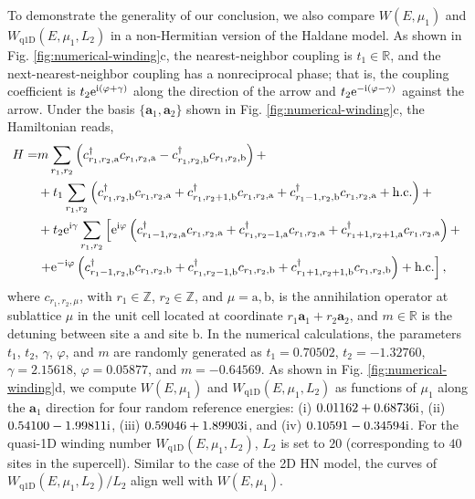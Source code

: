 To demonstrate the generality of our conclusion, we also compare $W(E,\mu_{1})$
and $W_{\text{q1D}}(E,\mu_{1},L_{2})$ in a non-Hermitian version
of the Haldane model. As shown in Fig. \ref{fig:numerical-winding}c,
the nearest-neighbor coupling is $t_{1}\in\mathbb{R}$, and the next-nearest-neighbor
coupling has a nonreciprocal phase; that is, the coupling coefficient
is $t_{2}\mathrm{e}^{\mathrm{i}\left(\varphi+\gamma\right)}$ along the direction
of the arrow and $t_{2}\mathrm{e}^{-\mathrm{i}\left(\varphi-\gamma\right)}$ against
the arrow. Under the basis $\{\mathbf{a}_{1},\mathbf{a}_{2}\}$ shown
in Fig. \ref{fig:numerical-winding}c, the Hamiltonian reads, 
\begin{align}
H= & m\sum_{r_{1},r_{2}}\left(c_{r_{1},r_{2},\mathrm{a}}^{\dagger}c_{r_{1},r_{2},\mathrm{a}}-c_{r_{1},r_{2},\mathrm{b}}^{\dagger}c_{r_{1},r_{2},\mathrm{b}}\right)+\nonumber \\
 & +t_{1}\sum_{r_{1},r_{2}}\left(c_{r_{1},r_{2},\mathrm{b}}^{\dagger}c_{r_{1},r_{2},\mathrm{a}}+c_{r_{1},r_{2}+1,\mathrm{b}}^{\dagger}c_{r_{1},r_{2},\mathrm{a}}+c_{r_{1}-1,r_{2},\mathrm{b}}^{\dagger}c_{r_{1},r_{2},\mathrm{a}}+\text{h.c.}\right)+\nonumber \\
 & +t_{2}\mathrm{e}^{\mathrm{i}\gamma}\sum_{r_{1},r_{2}}\left[\mathrm{e}^{\mathrm{i}\varphi}\left(c_{r_{1}-1,r_{2},\mathrm{a}}^{\dagger}c_{r_{1},r_{2},\mathrm{a}}+c_{r_{1},r_{2}-1,\mathrm{a}}^{\dagger}c_{r_{1},r_{2},\mathrm{a}}+c_{r_{1}+1,r_{2}+1,\mathrm{a}}^{\dagger}c_{r_{1},r_{2},\mathrm{a}}\right)+\right.\nonumber \\
 & \left.+\mathrm{e}^{-\mathrm{i}\varphi}\left(c_{r_{1}-1,r_{2},\mathrm{b}}^{\dagger}c_{r_{1},r_{2},\mathrm{b}}+c_{r_{1},r_{2}-1,\mathrm{b}}^{\dagger}c_{r_{1},r_{2},\mathrm{b}}+c_{r_{1}+1,r_{2}+1,\mathrm{b}}^{\dagger}c_{r_{1},r_{2},\mathrm{b}}\right)+\text{h.c.}\right],
\end{align}
where $c_{r_{1},r_{2},\mu}$, with $r_{1}\in\mathbb{Z}$, $r_{2}\in\mathbb{Z}$,
and $\mu=\mathrm{a},\mathrm{b}$, is the annihilation operator at
sublattice $\mu$ in the unit cell located at coordinate $r_{1}\mathbf{a}_{1}+r_{2}\mathbf{a}_{2}$,
and $m\in\mathbb{R}$ is the detuning between site $\mathrm{a}$ and
site $\mathrm{b}$. In the numerical calculations, the parameters
$t_{1}$, $t_{2}$, $\gamma$, $\varphi$, and $m$ are randomly generated
as $t_{1}=0.70502$, $t_{2}=-1.32760$, $\gamma=2.15618$, $\varphi=0.05877$,
and $m=-0.64569$. As shown in Fig. \ref{fig:numerical-winding}d,
we compute $W(E,\mu_{1})$ and $W_{\text{q1D}}(E,\mu_{1},L_{2})$
as functions of $\mu_{1}$ along the $\mathbf{a}_{1}$ direction for
four random reference energies: (i) $0.01162+0.68736\mathrm{i}$, (ii) $0.54100-1.99811\mathrm{i}$,
(iii) $0.59046+1.89903\mathrm{i}$, and (iv) $0.10591-0.34594\mathrm{i}$. For
the quasi-1D winding number $W_{\text{q1D}}(E,\mu_{1},L_{2})$, $L_{2}$
is set to $20$ (corresponding to $40$ sites in the supercell). Similar
to the case of the 2D HN model, the curves of $W_{\text{q1D}}(E,\mu_{1},L_{2})/L_{2}$
align well with $W(E,\mu_{1})$.

